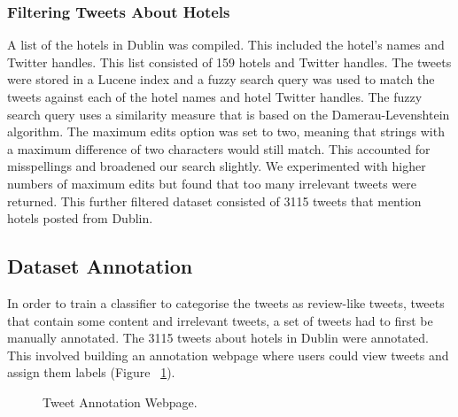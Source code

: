 \subsubsection{Filtering Tweets About Hotels}
A list of the hotels in Dublin was compiled. This included the hotel's names and Twitter handles. This list consisted of 159 hotels and Twitter handles. The tweets were stored in a Lucene index and a fuzzy search query was used to match the tweets against each of the hotel names and hotel Twitter handles. The fuzzy search query uses a similarity measure that is based on the Damerau-Levenshtein algorithm. The maximum edits option was set to two, meaning that strings with a maximum difference of two characters would still match. This accounted for misspellings and broadened our search slightly. We experimented with higher numbers of maximum edits but found that too many irrelevant tweets were returned. This further filtered dataset consisted of 3115 tweets that mention hotels posted from Dublin.

\subsection{Dataset Annotation}

In order to train a classifier to categorise the tweets as review-like tweets, tweets that contain some content and irrelevant tweets, a set of tweets had to first be manually annotated. The 3115 tweets about hotels in Dublin were annotated. This involved building an annotation webpage where users could view tweets and assign them labels (Figure ~\ref{fig:webpage}).

\begin{figure}[h!]
\centering
{}
\caption{\label{fig:webpage} Tweet Annotation Webpage.}
\end{figure}

